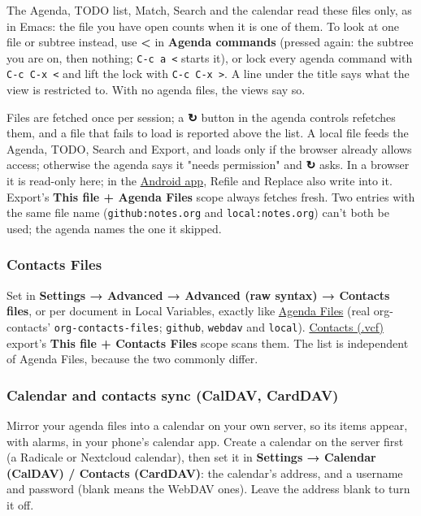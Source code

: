 \documentclass[11pt]{article}
\begin{document}
The Agenda, TODO list, Match, Search and the calendar read these files only, as in Emacs: the file you have open counts when it is one of them. To look at one file or subtree instead, use \textbf{<} in \textbf{Agenda commands} (pressed again: the subtree you are on, then nothing; \texttt{C-c a <} starts it), or lock every agenda command with \texttt{C-c C-x <} and lift the lock with \texttt{C-c C-x >}. A line under the title says what the view is restricted to. With no agenda files, the views say so.

Files are fetched once per session; a \textbf{↻} button in the agenda controls refetches them, and a file that fails to load is reported above the list. A local file feeds the Agenda, TODO, Search and Export, and loads only if the browser already allows access; otherwise the agenda says it "needs permission" and \textbf{↻} asks. In a browser it is read-only here; in the \hyperref[sec:org5b8e0d4]{Android app}, Refile and Replace also write into it. Export's \textbf{This file + Agenda Files} scope always fetches fresh. Two entries with the same file name (\texttt{github:notes.org} and \texttt{local:notes.org}) can't both be used; the agenda names the one it skipped.

\subsubsection{Contacts Files}
\label{sec:orgba3cd98}
Set in \textbf{Settings → Advanced → Advanced (raw syntax) → Contacts files}, or per document in Local Variables, exactly like \hyperref[sec:org4d24003]{Agenda Files} (real org-contacts' \texttt{org-contacts-files}; \texttt{github}, \texttt{webdav} and \texttt{local}). \hyperref[sec:org9a53e51]{Contacts (.vcf)} export's \textbf{This file + Contacts Files} scope scans them. The list is independent of Agenda Files, because the two commonly differ.

\subsubsection{Calendar and contacts sync (CalDAV, CardDAV)}
\label{sec:orge18f01c}
Mirror your agenda files into a calendar on your own server, so its items appear, with alarms, in your phone's calendar app. Create a calendar on the server first (a Radicale or Nextcloud calendar), then set it in \textbf{Settings → Calendar (CalDAV) / Contacts (CardDAV)}: the calendar's address, and a username and password (blank means the WebDAV ones). Leave the address blank to turn it off.
\end{document}
